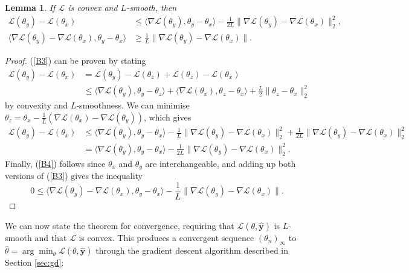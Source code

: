 \documentclass[a4paper,11pt,titlepage]{article}
\theoremstyle{definition}
\theoremstyle{plain}
\newtheorem{lemma}[theorem]{Lemma}
\theoremstyle{remark}
\begin{document}
\begin{lemma}
    If $\mathcal{L}$ is convex and $L$-smooth, then
    \begin{align}
        \mathcal{L}(\theta_y) - \mathcal{L}(\theta_x) &\leq \langle \nabla \mathcal{L}(\theta_y), \theta_y - \theta_x \rangle - \frac{1}{2L} \|\nabla \mathcal{L}(\theta_y) - \nabla \mathcal{L}(\theta_x) \|_2^2, \label{B3} \\
        \langle \nabla \mathcal{L}(\theta_y) - \nabla \mathcal{L}(\theta_x), \theta_y - \theta_x \rangle &\geq \frac{1}{L} \|\nabla \mathcal{L}(\theta_y) - \nabla \mathcal{L}(\theta_x)\|. \label{B4}
    \end{align}
\end{lemma}
\begin{proof}
    (\ref{B3}) can be proven by stating
    \begin{align*}
        \mathcal{L}(\theta_y) - \mathcal{L}(\theta_x) &= \mathcal{L}(\theta_y) - \mathcal{L}(\theta_z) + \mathcal{L}(\theta_z) -\mathcal{L}(\theta_x) \\
        &\leq \langle \nabla \mathcal{L}(\theta_y), \theta_y - \theta_z \rangle + \langle \nabla \mathcal{L}(\theta_x), \theta_z - \theta_x \rangle + \frac{L}{2} \|\theta_z - \theta_x\|_2^2
    \end{align*}
    by convexity and $L$-smoothness. We can minimise $\theta_z = \theta_x - \frac{1}{L}(\nabla \mathcal{L}(\theta_x) - \nabla \mathcal{L}(\theta_y))$, which gives
    \begin{align*}
        \mathcal{L}(\theta_y) - \mathcal{L}(\theta_x) &\leq \langle \nabla \mathcal{L}(\theta_y), \theta_y - \theta_x \rangle - \frac{1}{L} \|\nabla \mathcal{L}(\theta_y) - \nabla \mathcal{L}(\theta_x) \|_2^2 + \frac{1}{2L} \|\nabla \mathcal{L}(\theta_y) - \nabla \mathcal{L}(\theta_x) \|_2^2 \\
        &= \langle \nabla \mathcal{L}(\theta_y), \theta_y - \theta_x \rangle - \frac{1}{2L} \|\nabla \mathcal{L}(\theta_y) - \nabla \mathcal{L}(\theta_x) \|_2^2.
    \end{align*}
    Finally, (\ref{B4}) follows since $\theta_x$ and $\theta_y$ are interchangeable, and adding up both versions of (\ref{B3}) gives the inequality
    $$
    0 \leq \langle \nabla \mathcal{L}(\theta_y) - \nabla \mathcal{L}(\theta_x), \theta_y - \theta_x \rangle - \frac{1}{L} \|\nabla \mathcal{L}(\theta_y) - \nabla \mathcal{L}(\theta_x) \|.
    $$
\end{proof}

We can now state the theorem for convergence, requiring that $\mathcal{L}(\theta, \mathbf{\hat{y}})$ is $L$-smooth and that $\mathcal{L}$ is convex. This produces a convergent sequence $(\theta_n)_\infty$ to $\hat{\theta} = \arg\min_\theta \mathcal{L}(\theta, \mathbf{\hat{y}})$ through the gradient descent algorithm described in Section \ref{sec:gd}:
\end{document}
